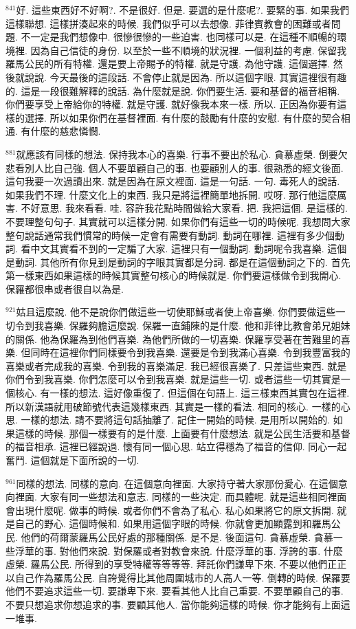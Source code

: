 \documentclass{book}
\begin{document}
$^{841}$好.
這些東西好不好啊?.
不是很好.
但是.
要選的是什麼呢?.
要緊的事.
如果我們這樣聯想.
這樣拼湊起來的時候.
我們似乎可以去想像.
菲律賓教會的困難或者問題.
不一定是我們想像中.
很慘很慘的一些迫害.
也同樣可以是.
在這種不順暢的環境裡.
因為自己信徒的身份.
以至於一些不順境的狀況裡.
一個利益的考慮.
保留我羅馬公民的所有特權.
還是要上帝賜予的特權.
就是守護.
為他守護.
這個選擇.
然後就說說.
今天最後的這段話.
不會停止就是因為.
所以這個字眼.
其實這裡很有趣的.
這是一段很難解釋的說話.
為什麼就是說.
你們要生活.
要和基督的福音相稱.
你們要享受上帝給你的特權.
就是守護.
就好像我本來一樣.
所以.
正因為你要有這樣的選擇.
所以如果你們在基督裡面.
有什麼的鼓勵有什麼的安慰.
有什麼的契合相通.
有什麼的慈悲憐憫.

$^{881}$就應該有同樣的想法.
保持我本心的喜樂.
行事不要出於私心.
貪慕虛榮.
倒要欠悲看別人比自己強.
個人不要單顧自己的事.
也要顧別人的事.
很熟悉的經文後面.
這句我要一次過讀出來.
就是因為在原文裡面.
這是一句話.
一句.
毒死人的說話.
如果我們不理.
什麼文化上的東西.
我只是將這裡簡單地拆開.
哎呀.
那行他這麼厲害.
不好意思.
我來看看.
哇.
容許我花點時間做給大家看.
把.
我把這個.
是這樣的.
不要理整句句子.
其實就可以這樣分開.
如果你們有這些一切的時候呢.
我想問大家整句說話通常我們慣常的時候一定會有需要有動詞.
動詞在哪裡.
這裡有多少個動詞.
看中文其實看不到的一定騙了大家.
這裡只有一個動詞.
動詞呢令我喜樂.
這個是動詞.
其他所有你見到是動詞的字眼其實都是分詞.
都是在這個動詞之下的.
首先第一樣東西如果這樣的時候其實整句核心的時候就是.
你們要這樣做令到我開心.
保羅都很串或者很自以為是.

$^{921}$姑且這麼說.
他不是說你們做這些一切使耶穌或者使上帝喜樂.
你們要做這些一切令到我喜樂.
保羅夠膽這麼說.
保羅一直鋪陳的是什麼.
他和菲律比教會弟兄姐妹的關係.
他為保羅為到他們喜樂.
為他們所做的一切喜樂.
保羅享受著在苦難里的喜樂.
但同時在這裡你們同樣要令到我喜樂.
還要是令到我滿心喜樂.
令到我豐富我的喜樂或者完成我的喜樂.
令到我的喜樂滿足.
我已經很喜樂了.
只差這些東西.
就是你們令到我喜樂.
你們怎麼可以令到我喜樂.
就是這些一切.
或者這些一切其實是一個核心.
有一樣的想法.
這好像重復了.
但這個在句語上.
這三樣東西其實包在這裡.
所以新漢語就用破節號代表這幾樣東西.
其實是一樣的看法.
相同的核心.
一樣的心思.
一樣的想法.
請不要將這句話抽離了.
記住一開始的時候.
是用所以開始的.
如果這樣的時候.
那個一樣要有的是什麼.
上面要有什麼想法.
就是公民生活要和基督的福音相承.
這裡已經說過.
懷有同一個心思.
站立得穩為了福音的信仰.
同心一起奮鬥.
這個就是下面所說的一切.

$^{961}$同樣的想法.
同樣的意向.
在這個意向裡面.
大家持守著大家那份愛心.
在這個意向裡面.
大家有同一些想法和意志.
同樣的一些決定.
而具體呢.
就是這些相同裡面會出現什麼呢.
做事的時候.
或者你們不會為了私心.
私心如果將它的原文拆開.
就是自己的野心.
這個時候和.
如果用這個字眼的時候.
你就會更加顯露到和羅馬公民.
他們的荷爾蒙羅馬公民好處的那種關係.
是不是.
後面這句.
貪慕虛榮.
貪慕一些浮華的事.
對他們來說.
對保羅或者對教會來說.
什麼浮華的事.
浮誇的事.
什麼虛榮.
羅馬公民.
所得到的享受特權等等等等.
拜託你們謙卑下來.
不要以他們正正以自己作為羅馬公民.
自誇覺得比其他周圍城市的人高人一等.
倒轉的時候.
保羅要他們不要追求這些一切.
要謙卑下來.
要看其他人比自己重要.
不要單顧自己的事.
不要只想追求你想追求的事.
要顧其他人.
當你能夠這樣的時候.
你才能夠有上面這一堆事.
\end{document}
